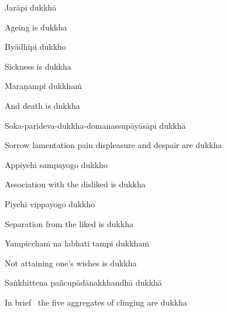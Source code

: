 Jarāpi dukkhā

\begin{cprenglish}
  Ageing is dukkha
\end{cprenglish}

Byādhipi dukkho

\begin{cprenglish}
  Sickness is dukkha
\end{cprenglish}

Maraṇampi dukkhaṁ

\begin{cprenglish}
  And death is dukkha
\end{cprenglish}

Soka-parideva-dukkha-domanassupāyāsāpi dukkhā

\begin{cprenglish}
  Sorrow lamentation pain displeasure
  and despair are dukkha
\end{cprenglish}

Appiyehi sampayogo dukkho

\begin{cprenglish}
  Association with the disliked is dukkha
\end{cprenglish}

Piyehi vippayogo dukkho

\begin{cprenglish}
  Separation from the liked is dukkha
\end{cprenglish}

Yampicchaṁ na labhati tampi dukkhaṁ

\begin{cprenglish}
  Not attaining one’s wishes is dukkha
\end{cprenglish}

Saṅkhittena pañcupādānakkhandhā dukkhā

\begin{cprenglish}
  In brief \breathmark\ the five aggregates of clinging are dukkha
\end{cprenglish}

